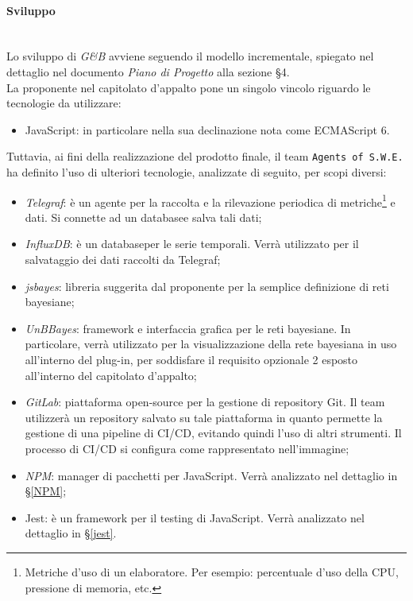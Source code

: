 \paragraph{Sviluppo} \-\\
\label{Progettazione_Sviluppo}
Lo sviluppo di \textit{G\&B} avviene seguendo il modello incrementale, spiegato nel dettaglio nel documento \textit{Piano di Progetto} alla sezione §4.\\
La proponente nel capitolato d'appalto pone un singolo vincolo riguardo le tecnologie da utilizzare:
\begin{itemize}
	\item JavaScript: in particolare nella sua declinazione nota come ECMAScript 6\glossario.
\end{itemize}
Tuttavia, ai fini della realizzazione del prodotto finale, il team \texttt{Agents of S.W.E.} ha definito l'uso di ulteriori tecnologie, analizzate di seguito, per scopi diversi:
\begin{itemize} 
	\item \textit{Telegraf}\glossario: è un agente per la raccolta e la rilevazione periodica di metriche\footnote{Metriche d'uso di un elaboratore. Per esempio: percentuale d'uso della CPU, pressione di memoria, etc.} e dati. Si connette ad un database\glossario e salva tali dati;
	\item \textit{InfluxDB}\glossario: è un database\glossario per le serie temporali. Verrà utilizzato per il salvataggio dei dati raccolti da Telegraf;
	\item \textit{jsbayes}\glossario: libreria suggerita dal proponente per la semplice definizione di reti bayesiane; 
	\item \textit{UnBBayes}\glossario: framework e interfaccia grafica per le reti bayesiane. In particolare, verrà utilizzato per la visualizzazione della rete bayesiana in uso all'interno del plug-in, per soddisfare il requisito opzionale 2 esposto all'interno del capitolato d'appalto;
	\item \textit{GitLab}\glossario: piattaforma open-source per la gestione di repository Git. Il team utilizzerà un repository salvato su tale piattaforma in quanto permette la gestione di una pipeline di CI/CD\glossario, evitando quindi l'uso di altri strumenti. Il processo di CI/CD si configura come rappresentato nell'immagine;
	\item \textit{NPM}\glossario: manager di pacchetti per JavaScript. Verrà analizzato nel dettaglio in §\ref{NPM};
	\item Jest: è un framework per il testing di JavaScript. Verrà analizzato nel dettaglio in §\ref{jest}.
\end{itemize}

